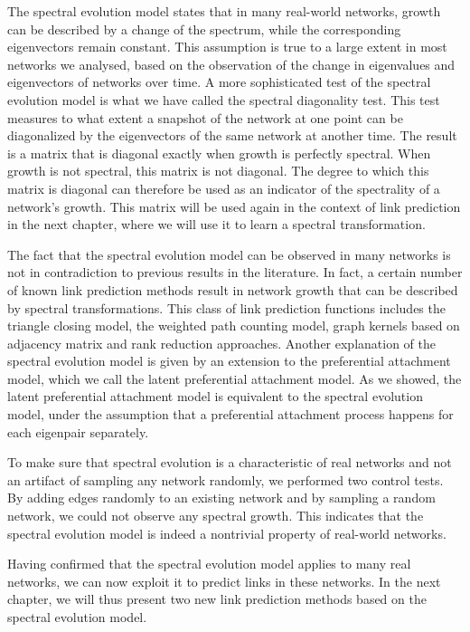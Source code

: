 \documentclass[11pt,a4paper]{book}
\begin{document}
The spectral evolution model states that in many real-world
networks, growth can be described by a change of the spectrum, while the
corresponding eigenvectors remain constant.  This assumption is true to
a large extent in most networks we analysed, based on the observation
of the change in eigenvalues and eigenvectors of networks over time.  A
more sophisticated test of the spectral evolution model is what we have
called the spectral diagonality test.  This test measures to what extent
a snapshot of the network at one point can be diagonalized by the
eigenvectors of the same network at another time.  The result is a
matrix that is diagonal exactly when growth is perfectly spectral.
When growth is not spectral, this matrix is not diagonal.  The degree to
which this matrix is diagonal can therefore be used as an indicator of
the spectrality of a network's growth. 
This matrix will be used again in the context of link prediction in the
next chapter, where
we will use it to learn a spectral transformation. 

The fact that the spectral evolution model can be observed in many
networks is not in contradiction to previous results in the literature.
In fact, a 
certain number of known link prediction methods result in network growth
that can be described by spectral transformations.  This class of link
prediction functions includes the triangle closing model, the weighted
path counting model, graph kernels based on adjacency matrix and rank
reduction approaches.  
Another explanation of the spectral evolution model is given by an
extension to the preferential attachment model, which we call the latent
preferential attachment model. 
As we showed, the latent preferential attachment model is equivalent
to the spectral evolution model, under the assumption that a
preferential attachment process happens for each eigenpair
separately.  

To make sure that spectral evolution is a characteristic of real networks and
not an artifact of sampling any network randomly, we performed two
control tests.  By adding edges randomly to an existing network and by
sampling a random network, we could not observe any spectral
growth. This indicates that the spectral evolution model is indeed a
nontrivial property of real-world networks. 

Having confirmed that the spectral evolution model applies to many real
networks,
we can now exploit it to predict links in these networks. 
In the next chapter, we will thus present two new link prediction methods
based on the spectral evolution model.  
\end{document}
